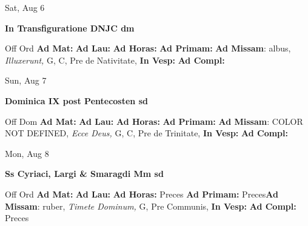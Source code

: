 \documentclass[10pt]{book}
\begin{document}
\begin{center}
\begin{minipage}{3.5in}
\vspace{2em}
\begin{center}Sat, Aug 6
\end{center}
\textbf{ \large In Transfiguratione DNJC
\textnormal{\normalsize dm}}

\begin{justify}Off Ord
\textbf{Ad Mat: }
\textbf{Ad Lau: }
\textbf{Ad Horas: }
\textbf{Ad Primam: }\textbf{Ad Missam}: albus, \textit{Illuxerunt,} G, C, Pre de Nativitate, 
\textbf{In Vesp: }
\textbf{Ad Compl: }
\end{justify}
\end{minipage}
\end{center}

\begin{center}
\begin{minipage}{3.5in}
\vspace{2em}
\begin{center}Sun, Aug 7
\end{center}
\textbf{ \large Dominica IX post Pentecosten
\textnormal{\normalsize sd}}

\begin{justify}Off Dom
\textbf{Ad Mat: }
\textbf{Ad Lau: }
\textbf{Ad Horas: }
\textbf{Ad Primam: }\textbf{Ad Missam}: COLOR NOT DEFINED, \textit{Ecce Deus,} G, C, Pre de Trinitate, 
\textbf{In Vesp: }
\textbf{Ad Compl: }
\end{justify}
\end{minipage}
\end{center}

\begin{center}
\begin{minipage}{3.5in}
\vspace{2em}
\begin{center}Mon, Aug 8
\end{center}
\textbf{ \large Ss Cyriaci, Largi \& Smaragdi Mm
\textnormal{\normalsize sd}}

\begin{justify}Off Ord
\textbf{Ad Mat: }
\textbf{Ad Lau: }
\textbf{Ad Horas: }Preces
\textbf{Ad Primam: }Preces\textbf{Ad Missam}: ruber, \textit{Timete Dominum,} G, Pre Communis, 
\textbf{In Vesp: }
\textbf{Ad Compl: }Preces
\end{justify}
\end{minipage}
\end{center}
\end{document}
